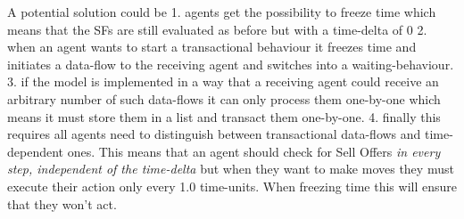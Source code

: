 A potential solution could be
1. agents get the possibility to freeze time which means that the SFs are still evaluated as before but with a time-delta of 0
2. when an agent wants to start a transactional behaviour it freezes time and initiates a data-flow to the receiving agent and switches into a waiting-behaviour.
3. if the model is implemented in a way that a receiving agent could receive an arbitrary number of such data-flows it can only process them one-by-one which means it must store them in a list and transact them one-by-one.
4. finally this requires all agents need to distinguish between transactional data-flows and time-dependent ones. This means that an agent should check for Sell Offers \textit{in every step, independent of the time-delta} but when they want to make moves they must execute their action only every 1.0 time-units. When freezing time this will ensure that they won't act.